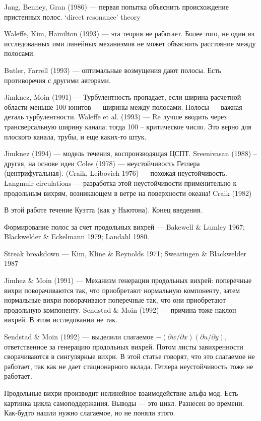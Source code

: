 Jang, Benney, Gran (1986) --- первая попытка объяснить происхождение пристенных полос. ‘direct resonance’ theory

Waleffe, Kim, Hamilton (1993) --- эта теория не работает. Более того, не один из исследованных ими линейных механизмов не может объяснить расстояние между полосами. 

Butler, Farrell (1993) --- оптимальные возмущения дают полосы. Есть противоречия с другими авторами. 

Jimknez, Moin (1991) --- Турбулентность пропадает, если ширина расчетной области меньше 100 юнитов --- ширины между полосами. Полосы --- важная деталь турбулентности. Waleffe et al. (1993) --- Re лучше вводить через трансверсальную ширину канала; тогда 100 -- критическое число. Это верно для плоского канала, трубы, и еще каких-то штук. 

Jimknez (1994) --- модель течения, воспроизводящая ЦСПТ. Sreenivasan (1988) -- другая, на основе идеи Coles (1978) --- неустойчивость Гетлера (центрифугальная). (Craik, Leibovich 1976) --- похожая неустойчивость. Langmuir circulations --- разработка этой неустойчивости применительно к продольным вихрям, возникающем в ветре на поверхности океана! Craik (1982)

В этой работе течение Куэтта (как у Ньютона). Конец введения. 

Формирование полос за счет продольных вихрей --- Bakewell \& Lumley 1967; Blackwelder \& Eckelmann 1979; Landahl 1980. 

Streak breakdown --- Kim, Kline \& Reynolds 1971; Swearingen \& Blackwelder 1987

Jimhez \& Moin (1991) --- Механизм генерации продольных вихрей: поперечные вихри поворачиваются так, что приобретают нормальную компоненту, затем нормальные вихри поворачивают поперечные так, что они приобретают продольную компоненту. Sendstad \&  Moin (1992) --- причина тоже наклон вихрей. В этом исследовании не так. 

Sendstad \& Moin (1992) --- выделили слагаемое $ - (\partial w / \partial x) (\partial u / \partial y)$, ответственное за генерацию продольных вихрей. Потом листы завихренности сворачиваются в сингулярные вихри. В этой статье говорят, что это слагаемое не работает, так как не дает стационарного вклада. Гетлера неустойчивость тоже не работает. 

Продольные вихри производит нелинейное взаимодействие альфа мод. 
Есть картинка цикла самоподдержания. Выводы --- это цикл. Разнесен во времени. Как-будто нашли нужно слагаемое, но не поняли этого. 

